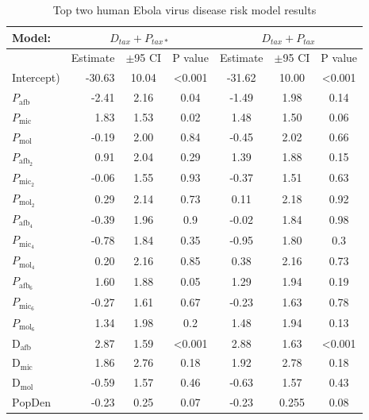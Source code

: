 \documentclass[a4paper,twoside, onecolumn]{article}
\newcommand{\afb}{\mathrm{afb}}
\newcommand{\mic}{\mathrm{mic}}
\newcommand{\mol}{\mathrm{mol}}
\newcommand{\Div}{\mathrm{D}}
\begin{document}
\begin{table}[h!]
	\centering
	\caption{Top two human Ebola virus disease risk model results\\}
	\label{table:spatGLM_HUM}	%
	\begin{tabular}{lcccccc}
		Model: & \multicolumn{3}{c}{$D_{tax} + P_{tax*}$} & \multicolumn{3}{c}{$D_{tax} + P_{tax}$} \\
		\hline\hline
		&  Estimate & $\pm$95 CI  &  P value &  Estimate & $\pm$95 CI &  P value \\
		\hline
		Intercept) & \multicolumn{1}{r}{-30.63} & 10.04 & <0.001 & -31.62 & 10.00 & <0.001 \\
		$P_{\afb}$ & \multicolumn{1}{r}{-2.41} & 2.16 & 0.04 & -1.49 & 1.98 & 0.14 \\
		$P_{\mic}$ & \multicolumn{1}{r}{1.83} & 1.53 & 0.02 & 1.48 & 1.50 & 0.06 \\
		$P_{\mol}$ & \multicolumn{1}{r}{-0.19} & 2.00 & 0.84 & -0.45 & 2.02 & 0.66 \\
		$P_{\afb_2}$ & \multicolumn{1}{r}{0.91} & 2.04 & 0.29 & 1.39 & 1.88 & 0.15 \\
		$P_{\mic_2}$ & \multicolumn{1}{r}{-0.06} & 1.55 & 0.93 & -0.37 & 1.51 & 0.63 \\
		$P_{\mol_2}$ & \multicolumn{1}{r}{0.29} & 2.14 & 0.73 & 0.11 & 2.18 & 0.92 \\
		$P_{\afb_4}$ & \multicolumn{1}{r}{-0.39} & 1.96 & 0.9 & -0.02 & 1.84 & 0.98 \\
		$P_{\mic_4}$ & \multicolumn{1}{r}{-0.78} & 1.84 & 0.35 & -0.95 & 1.80 & 0.3 \\
		$P_{\mol_4}$ & \multicolumn{1}{r}{0.20} & 2.16 & 0.85 & 0.38 & 2.16 & 0.73 \\
		$P_{\afb_6}$ & \multicolumn{1}{r}{1.60} & 1.88 & 0.05 & 1.29 & 1.94 & 0.19 \\
		$P_{\mic_6}$ & \multicolumn{1}{r}{-0.27} & 1.61 & 0.67 & -0.23 & 1.63 & 0.78 \\
		$P_{\mol_6}$ & \multicolumn{1}{r}{1.34} & 1.98 & 0.2 & 1.48 & 1.94 & 0.13 \\
		$\Div_{\afb}$ & \multicolumn{1}{r}{2.87} & 1.59 & <0.001 & 2.88 & 1.63 & <0.001 \\
		$\Div_{\mic}$ & \multicolumn{1}{r}{1.86} & 2.76 & 0.18 & 1.92 & 2.78 & 0.18 \\
		$\Div_{\mol}$ & \multicolumn{1}{r}{-0.59} & 1.57 & 0.46 & -0.63 & 1.57 & 0.43 \\
		$\mathrm{PopDen}$ & \multicolumn{1}{r}{-0.23} & 0.25 & 0.07 & -0.23 & 0.255 & 0.08 \\

\end{tabular}
\end{table}
\end{document}
